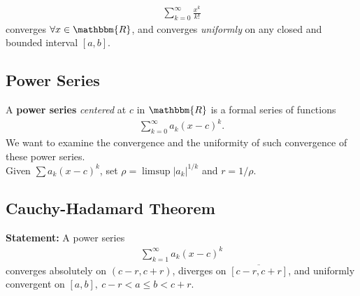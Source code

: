 \documentclass[10pt]{extarticle}
\newcommand{\R}{\mathbbm{R}}
\begin{document}
    \begin{align*}
      \sum_{k=0}^{\infty}\frac{x^k}{k!}
    \end{align*}
    converges $\forall x\in\R$, and converges \textit{uniformly} on any closed and bounded interval $[a,b]$.
  \subsection{Power Series}%
    A \textbf{power series} \textit{centered} at $c$ in $\R$ is a formal series of functions
    \begin{align*}
      \sum_{k=0}^{\infty} a_k(x-c)^k.
    \end{align*}
    We want to examine the convergence and the uniformity of such convergence of these power series.\\

    Given $\sum a_k(x-c)^k$, set $\rho = \limsup|a_k|^{1/k}$ and $r = 1/\rho$.
  \subsection{Cauchy-Hadamard Theorem}%
    \textbf{Statement:} A power series
    \begin{align*}
      \sum_{k=1}^{\infty} a_k(x-c)^k
    \end{align*}
    converges absolutely on $(c-r,c+r)$, diverges on $\overline{[c-r,c+r]}$, and uniformly convergent on $[a,b],~c-r < a \leq b < c + r$.\\
\end{document}
